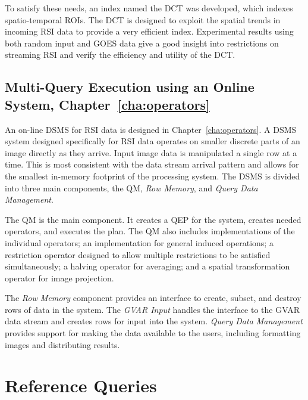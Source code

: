 \documentclass{ucdthesis}       %
\begin{document}
To satisfy these needs, an index named the \acf{DCT} was developed,
which indexes spatio-temporal \acp{ROI}.  The \ac{DCT} is designed to
exploit the spatial trends in incoming \ac{RSI} data to provide a very
efficient index.  Experimental results using both random input and
\acf{GOES} data give a good insight into restrictions on streaming \ac{RSI}
and verify the efficiency and utility of the \ac{DCT}.

\subsection*{Multi-Query Execution using an Online System,
  Chapter~\ref{cha:operators}}

An on-line \ac{DSMS} for \ac{RSI} data is designed in
Chapter~\ref{cha:operators}.  A \ac{DSMS} system designed specifically
for \ac{RSI} data operates on smaller discrete parts of an image
directly as they arrive.  Input image data is manipulated a single row
at a time.  This is most consistent with the data stream arrival
pattern and allows for the smallest in-memory footprint of the
processing system.  The \ac{DSMS} is divided into three main
components, the \acf{QM}, \emph{Row Memory}, and \emph{Query Data
 Management}.

The \ac{QM} is the main component.  It creates a \acf{QEP} for the
system, creates needed operators, and executes the plan.  The \ac{QM}
also includes implementations of the individual operators; an
implementation for general induced operations; a restriction operator
designed to allow multiple restrictions to be satisfied
simultaneously; a halving operator for averaging; and a spatial
transformation operator for image projection.

The \emph{Row Memory} component provides an interface to create,
subset, and destroy rows of data in the system.  The \emph{\ac{GVAR}
  Input} handles the interface to the \ac{GVAR} data stream and
creates rows for input into the system.  \emph{Query Data Management}
provides support for making the data available to the users, including
formatting images and distributing results.


\section{Reference Queries}
\label{sec:queries}
\end{document}
